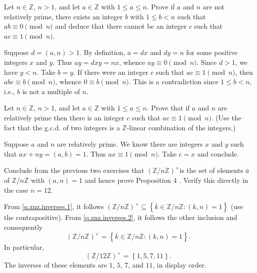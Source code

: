 \begin{questions}
\question\label{q.znz.inverses.1}
    Let \(n \in \mathbb{Z}\), \(n>1\), and let \(a \in \mathbb{Z}\) with \(1 \leq a \leq n\). Prove if \(a\) and \(n\) are not relatively prime, there exists an integer \(b\) with \(1 \leq b<n\) such that \(a b \equiv 0\pmod n\) and deduce that there cannot be an integer \(c\) such that \(a c \equiv 1\pmod n\).
\begin{theproof}
    Suppose \(d=(a,n ) > 1\).
    By definition, \( a = dx \) and \(dy = n\) for some positive integers \(x\)  and \(y\).
    Thus \(ay = dxy = nx\), whence \(ay \equiv 0\pmod n\). Since \(d >1\), we have \(y < n\). 
    Take \(b = y\).
    If there were an integer \(c\) such that \(a c \equiv 1\pmod n\), then \(abc \equiv b \pmod n\), whence \(0\equiv b\pmod n\). This is a contradiction since \(1 \leq b<n\), i.e., \(b\) is not a multiple of \(n\).
\end{theproof}


\question\label{q.znz.inverses.2}
    Let \(n \in \mathbb{Z}\), \(n>1\), and let \(a \in \mathbb{Z}\) with \(1 \leq a \leq n\). Prove that if \(a\) and \(n\) are relatively prime then there is an integer \(c\) such that \(a c \equiv 1\pmod n\). (Use the fact that the g.c.d. of two integers is a \(\mathbb{Z}\)-linear combination of the integers.)
\begin{theproof}
    Suppose \(a\) and \(n\) are relatively prime. We know there are integers \(x\) and \(y\) such that \(ax+ny = (a,b) = 1\). Thus \(ax \equiv  1\pmod n\). Take \(c=x\) and conclude.
\end{theproof}


\question
    Conclude from the previous two exercises that \((\mathbb{Z} / n \mathbb{Z})^{\times}\)is the set of elements \(\bar{a}\) of \(\mathbb{Z} / n \mathbb{Z}\) with \((a, n)=1\) and hence prove Proposition 4 . Verify this directly in the case \(n=12\).
\begin{solution}
From \ref{q.znz.inverses.1},  it follows  \((\mathbb{Z} / n \mathbb{Z})^{\times}\subseteq \left\{ \overline{k}\in\mathbb{Z} / n \mathbb{Z} : (k,n) = 1 \right\}\)  (use the contrapositive). From \ref{q.znz.inverses.2}, it follows the other inclusion and consequently \[(\mathbb{Z} / n \mathbb{Z})^{\times}= \left\{ \overline{k}\in\mathbb{Z} / n \mathbb{Z} : (k,n) = 1 \right\}.\]
In particular, \[
    (\mathbb{Z} / 12 \mathbb{Z})^{\times}=
    \left\{ 
        1,5,7,11
     \right\}.
\] The inverses of these elements are \(1\), \(5\), \(7\), and \(11\), in display order.
\end{solution}



\end{questions}
